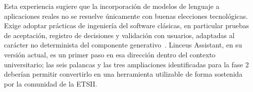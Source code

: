 Esta experiencia sugiere que la incorporación de modelos de lenguaje a aplicaciones reales no se resuelve únicamente con buenas elecciones tecnológicas. Exige adoptar prácticas de ingeniería del software clásicas, en particular pruebas de aceptación, registro de decisiones y validación con usuarios, adaptadas al carácter no determinista del componente generativo~\cite{holtzman2020curious}. Linceus Assistant, en su versión actual, es un primer paso en esa dirección dentro del contexto universitario; las seis palancas y las tres ampliaciones identificadas para la fase 2 deberían permitir convertirlo en una herramienta utilizable de forma sostenida por la comunidad de la ETSII.
